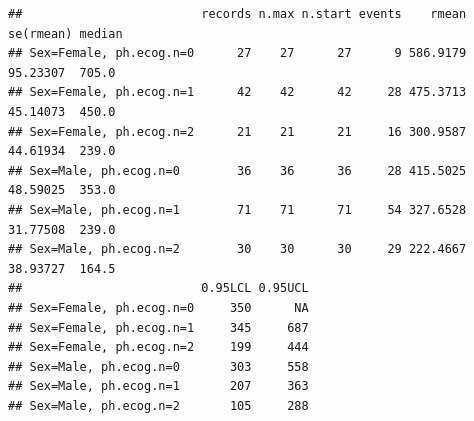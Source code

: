 \documentclass[
]{article}
\newenvironment{Shaded}{\begin{snugshade}}{\end{snugshade}}
\newcommand{\AttributeTok}[1]{\textcolor[rgb]{0.77,0.63,0.00}{#1}}
\newcommand{\CommentTok}[1]{\textcolor[rgb]{0.56,0.35,0.01}{\textit{#1}}}
\newcommand{\ConstantTok}[1]{\textcolor[rgb]{0.00,0.00,0.00}{#1}}
\newcommand{\DecValTok}[1]{\textcolor[rgb]{0.00,0.00,0.81}{#1}}
\newcommand{\FunctionTok}[1]{\textcolor[rgb]{0.00,0.00,0.00}{#1}}
\newcommand{\NormalTok}[1]{#1}
\newcommand{\OtherTok}[1]{\textcolor[rgb]{0.56,0.35,0.01}{#1}}
\newcommand{\SpecialCharTok}[1]{\textcolor[rgb]{0.00,0.00,0.00}{#1}}
\newcommand{\StringTok}[1]{\textcolor[rgb]{0.31,0.60,0.02}{#1}}
\begin{document}
\begin{Shaded}
\end{Shaded}

\begin{verbatim}
##                         records n.max n.start events    rmean se(rmean) median
## Sex=Female, ph.ecog.n=0      27    27      27      9 586.9179  95.23307  705.0
## Sex=Female, ph.ecog.n=1      42    42      42     28 475.3713  45.14073  450.0
## Sex=Female, ph.ecog.n=2      21    21      21     16 300.9587  44.61934  239.0
## Sex=Male, ph.ecog.n=0        36    36      36     28 415.5025  48.59025  353.0
## Sex=Male, ph.ecog.n=1        71    71      71     54 327.6528  31.77508  239.0
## Sex=Male, ph.ecog.n=2        30    30      30     29 222.4667  38.93727  164.5
##                         0.95LCL 0.95UCL
## Sex=Female, ph.ecog.n=0     350      NA
## Sex=Female, ph.ecog.n=1     345     687
## Sex=Female, ph.ecog.n=2     199     444
## Sex=Male, ph.ecog.n=0       303     558
## Sex=Male, ph.ecog.n=1       207     363
## Sex=Male, ph.ecog.n=2       105     288
\end{verbatim}

\begin{Shaded}
\end{Shaded}
\end{document}
